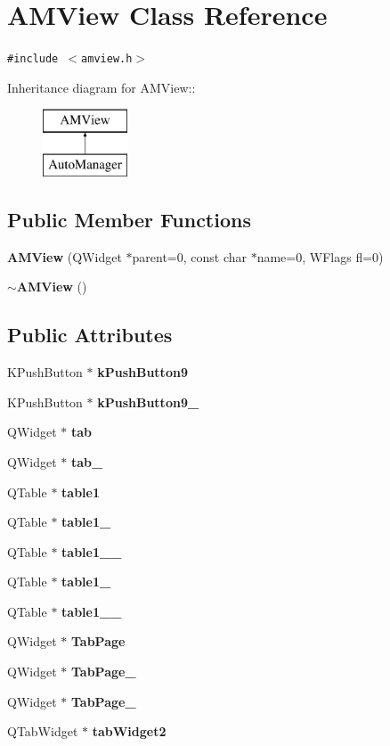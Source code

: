 \section{AMView Class Reference}
\label{classAMView}
{\tt \#include $<$amview.h$>$}

Inheritance diagram for AMView::\begin{figure}[H]
\begin{center}
\leavevmode
\includegraphics[height=2cm]{classAMView}
\end{center}
\end{figure}
\subsection*{Public Member Functions}
\begin{CompactItemize}
\item 
{\bf AMView} (QWidget $\ast$parent=0, const char $\ast$name=0, WFlags fl=0)
\item 
{\bf $\sim$AMView} ()
\end{CompactItemize}
\subsection*{Public Attributes}
\begin{CompactItemize}
\item 
KPush\-Button $\ast$ {\bf k\-Push\-Button9}
\item 
KPush\-Button $\ast$ {\bf k\-Push\-Button9\_}
\item 
QWidget $\ast$ {\bf tab}
\item 
QWidget $\ast$ {\bf tab\_}
\item 
QTable $\ast$ {\bf table1}
\item 
QTable $\ast$ {\bf table1\_}
\item 
QTable $\ast$ {\bf table1\_\_}
\item 
QTable $\ast$ {\bf table1\_}
\item 
QTable $\ast$ {\bf table1\_\_}
\item 
QWidget $\ast$ {\bf Tab\-Page}
\item 
QWidget $\ast$ {\bf Tab\-Page\_}
\item 
QWidget $\ast$ {\bf Tab\-Page\_}
\item 
QTab\-Widget $\ast$ {\bf tab\-Widget2}
\end{CompactItemize}
